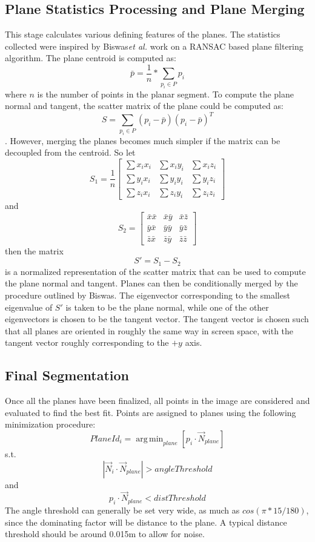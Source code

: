 \subsection{Plane Statistics Processing and Plane Merging}
This stage calculates various defining features of the planes. The statistics collected were inspired by Biswas\textit{et al.} work on a RANSAC based plane filtering algorithm\cite{biswas2012planar}. The plane centroid is computed as: $$\bar{p}=\frac{1}{n}*\sum_{p_i \in P}{p_i}$$ where $n$ is the number of points in the planar segment. To compute the plane normal and tangent, the scatter matrix of the plane could be computed as: $$S = \sum_{p_i \in P}(p_i-\bar{p})(p_i-\bar{p})^T$$.
However, merging the planes becomes much simpler if the matrix can be decoupled from the centroid\cite{biswas2012planar}. So let 
$$S_1 = \frac{1}{n}\begin{bmatrix}
  \sum{x_i x_i} & \sum{x_i y_i} & \sum{x_i z_i} \\
  \sum{y_i x_i} & \sum{y_i y_i} & \sum{y_i z_i} \\
  \sum{z_i x_i} & \sum{z_i y_i} & \sum{z_i z_i}
 \end{bmatrix}$$
and
 $$S_2 = \begin{bmatrix}
  \bar{x}\bar{x} & \bar{x}\bar{y} & \bar{x}\bar{z} \\
  \bar{y}\bar{x} & \bar{y}\bar{y} & \bar{y}\bar{z} \\
  \bar{z}\bar{x} & \bar{z}\bar{y} & \bar{z}\bar{z}
 \end{bmatrix}$$
then the matrix
 $$S'=S_1-S_2$$
is a normalized representation of the scatter matrix that can be used to compute the plane normal and tangent. Planes can then be conditionally merged by the procedure outlined by Biswas\cite{biswas2012planar}. 
The eigenvector corresponding to the smallest eigenvalue of $S'$ is taken to be the plane normal, while one of the other eigenvectors is chosen to be the tangent vector. The tangent vector is chosen such that all planes are oriented in roughly the same way in screen space, with the tangent vector roughly corresponding to the $+y$ axis.
\subsection{Final Segmentation}
Once all the planes have been finalized, all points in the image are considered and evaluated to find the best fit. Points are assigned to planes using the following minimization procedure:
$$PlaneId_i = \operatorname{arg\,min}_{plane} [ p_i \cdot \vec{N}_{plane} ]$$ s.t. $$|\vec{N}_i \cdot \vec{N}_{plane}| > angleThreshold$$ and $$p_i \cdot \vec{N}_{plane} < distThreshold$$
The angle threshold can generally be set very wide, as much as $cos(\pi*15/180)$, since the dominating factor will be distance to the plane. A typical distance threshold should be around 0.015m to allow for noise.
